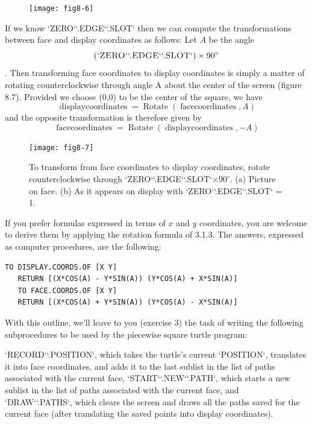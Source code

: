 \documentclass{book}
\begin{document}
\begin{figure}
\begin{center}
\texttt{[image: fig8-6]}
\caption{}
\end{center}
\end{figure}

If we know \textsc{`ZERO`}\textsc{`.EDGE`}\textsc{`.SLOT`} then we can compute the transformations
between face and display coordinates as follows: Let $A$ be the angle
$$(\text{\textsc{`ZERO`}\textsc{`.EDGE`}\textsc{`.SLOT`}}) \times 90^{\circ}$$. Then transforming face coordinates to display
coordinates is simply a matter of rotating counterclockwise through
angle A about the center of the screen (figure 8.7). Provided we choose
(0,0) to be the center of the square, we have
$$\operatorname{display coordinates} = \operatorname{Rotate}(\operatorname{face coordinates}, A)$$
 and the opposite transformation is therefore given by
$$\operatorname{face coordinates} = \operatorname{Rotate}(\operatorname{display coordinates}, -A)$$

\begin{figure}
\begin{center}
\texttt{[image: fig8-7]}
\caption{To transform from face coordinates to display coordinates, rotate counterclockwise through \textsc{`ZERO`}\textsc{`.EDGE`}\textsc{`.SLOT`}$\times 90^{\circ}$. (a) Picture on face. (b) As it appears on display with \textsc{`ZERO`}\textsc{`.EDGE`}\textsc{`.SLOT`} = 1.}
\end{center}
\end{figure}

If you prefer formulas expressed in terms of $x$ and $y$ coordinates, you
are welcome to derive them by applying the rotation formula of 3.1.3.
The answers, expressed as computer procedures, are the following:

\begin{verbatim}
TO DISPLAY.COORDS.OF [X Y]
   RETURN [(X*COS(A) - Y*SIN(A)) (Y*COS(A) + X*SIN(A)]
   TO FACE.COORDS.OF [X Y]
   RETURN [(X*COS(A) + Y*SIN(A)) (Y*COS(A) - X*SIN(A)]
\end{verbatim}
With this outline, we'll leave to you (exercise 3) the task of writing
the following subprocedures to be used by the piecewise square turtle
program:

\textsc{`RECORD`}\textsc{`.POSITION`}, which takes the turtle's current \textsc{`POSITION`}, translates it into face coordinates, and adds it to the last sublist in the list of
paths associated with the current face, \textsc{`START`}\textsc{`.NEW`}\textsc{`.PATH`}, which starts a new sublist in the list of paths associated with the current face, and \textsc{`DRAW`}\textsc{`.PATHS`}, which clears the screen and draws all the paths saved
for the current face (after translating the saved points into display coordinates).
\end{document}
